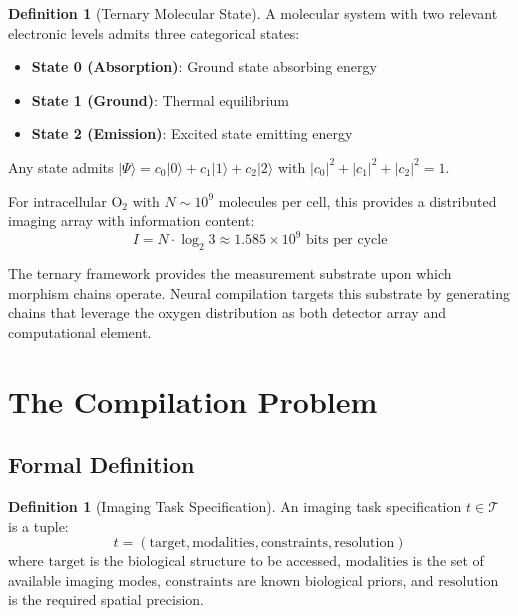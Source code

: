 \documentclass[11pt,a4paper]{article}
\theoremstyle{definition}
\newtheorem{definition}[theorem]{Definition}
\theoremstyle{remark}
\begin{document}
\begin{definition}[Ternary Molecular State]
A molecular system with two relevant electronic levels admits three categorical states:
\begin{itemize}
\item \textbf{State 0 (Absorption)}: Ground state absorbing energy
\item \textbf{State 1 (Ground)}: Thermal equilibrium
\item \textbf{State 2 (Emission)}: Excited state emitting energy
\end{itemize}
Any state admits $|\Psi\rangle = c_0|0\rangle + c_1|1\rangle + c_2|2\rangle$ with $|c_0|^2 + |c_1|^2 + |c_2|^2 = 1$.
\end{definition}

For intracellular O$_2$ with $N \sim 10^9$ molecules per cell, this provides a distributed imaging array with information content:
\begin{equation}
I = N \cdot \log_2 3 \approx 1.585 \times 10^9 \text{ bits per cycle}
\end{equation}

The ternary framework provides the measurement substrate upon which morphism chains operate. Neural compilation targets this substrate by generating chains that leverage the oxygen distribution as both detector array and computational element.

\section{The Compilation Problem}
\label{sec:compilation}

\subsection{Formal Definition}

\begin{definition}[Imaging Task Specification]
\label{def:task}
An imaging task specification $t \in \mathcal{T}$ is a tuple:
\begin{equation}
t = (\text{target}, \text{modalities}, \text{constraints}, \text{resolution})
\end{equation}
where $\text{target}$ is the biological structure to be accessed, $\text{modalities}$ is the set of available imaging modes, $\text{constraints}$ are known biological priors, and $\text{resolution}$ is the required spatial precision.
\end{definition}
\end{document}
